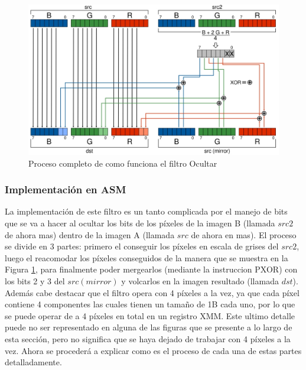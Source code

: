 \documentclass[a4paper]{article}
\begin{document}
\begin{figure}[h]
  \begin{center}
	\includegraphics[scale=0.30]{images/filtro-ocultar-bits.jpg}
	\caption{Proceso completo de como funciona el filtro Ocultar}
	\label{fig:filtro-ocultar-bits}
  \end{center}
\end{figure}

\newpage
 
\subsubsection{Implementación en ASM}
 

La implementación de este filtro es un tanto complicada por el manejo de bits que se va a hacer al ocultar los bits de los píxeles de la imagen B (llamada $src2$ de ahora mas) dentro de la imagen A (llamada $src$ de ahora en mas). El proceso se divide en 3 partes: primero el conseguir los píxeles en escala de grises del $src2$, luego el reacomodar los píxeles conseguidos de la manera que se muestra en la Figura \ref{fig:filtro-ocultar-bits}, para finalmente poder mergearlos (mediante la instruccion PXOR) con los bits 2 y 3 del $src(mirror)$ y volcarlos en la imagen resultado (llamada $dst$). Además cabe destacar que el filtro opera con 4 píxeles a la vez, ya que cada píxel contiene 4 componentes las cuales tienen un tamaño de 1B cada uno, por lo que se puede operar de a 4 píxeles en total en un registro XMM. Este ultimo detalle puede no ser representado en alguna de las figuras que se presente a lo largo de esta sección, pero no significa que se haya dejado de trabajar con 4 píxeles a la vez.
Ahora se procederá a explicar como es el proceso de cada una de estas partes detalladamente.
\end{document}
